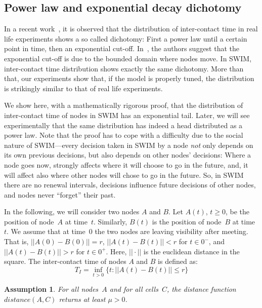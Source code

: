 \documentclass[conference]{IEEEtran}
\newtheorem{assumption}{Assumption}
\begin{document}
\subsection{Power law and exponential decay dichotomy}

In a recent work~\cite{milan07}, it is observed that the distribution of
inter-contact time in real life experiments shows a so  called dichotomy: First
a power law until a certain point in time, then an exponential cut-off.
In~\cite{cai07mobicom}, the authors suggest that the exponential cut-off is due
to the bounded domain where nodes move. In SWIM, inter-contact time distribution
shows exactly the same dichotomy. More than that, our experiments show that, if
the model is properly tuned, the distribution is strikingly similar to that of
real life experiments.

We show here, with a mathematically rigorous proof, that the distribution of
inter-contact time of nodes in SWIM has an exponential
tail. Later, we will see experimentally that the same distribution has indeed
a head distributed as a power law. Note that the proof has to cope with a
difficulty due to the social nature of SWIM---every decision taken in SWIM by a
node \emph{not} only depends on its own previous decisions, but also depends on
other nodes' decisions: Where a node goes now, strongly affects where it
will choose to go in the future, and, it will affect also where other
nodes will chose to go in the future. So, in SWIM there are no renewal
intervals, decisions influence future decisions of other nodes, and nodes never
``forget'' their past.

In the following, we will consider two nodes $A$ and $B$. Let $A(t)$, $t\ge0$,
be the position of node~$A$ at time~$t$. Similarly, $B(t)$ is the position of
node~$B$ at time~$t$. We assume that at time~$0$ the two nodes are leaving
visibility after meeting. That is, $||A(0)-B(0)||=r$, $||A(t)-B(t)||<r$ for
$t\in 0^-$, and $||A(t)-B(t)||>r$ for $t\in 0^+$. Here, $||\cdot||$ is the
euclidean distance in the square. The inter-contact time of nodes $A$ and $B$
is defined as:
\begin{equation*}
T_I=\inf_{t>0} \{t:||A(t)-B(t)||\le r\}
\end{equation*}
\begin{assumption}
\label{ass:lower}
For all nodes~$A$ and for all cells~$C$, the distance function $distance(A,C)$
returns at least $\mu>0$.
\end{assumption}
\end{document}

